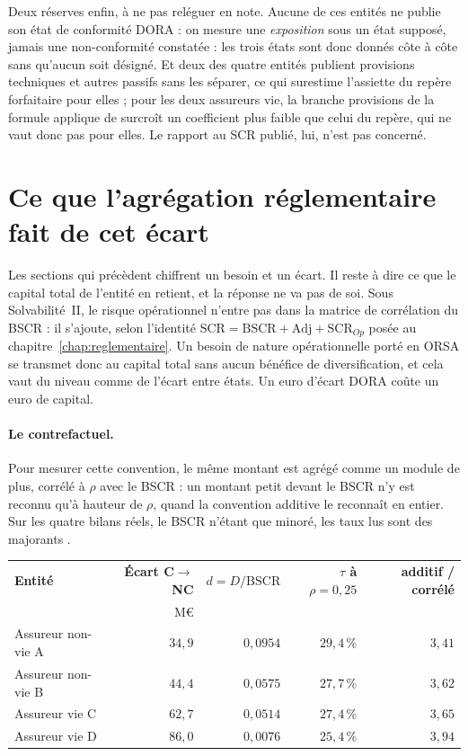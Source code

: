 Deux réserves enfin, à ne pas reléguer en note. Aucune de ces entités ne publie son état de
conformité DORA : on mesure une \emph{exposition} sous un état supposé, jamais une
non-conformité constatée : les trois états sont donc donnés côte à côte sans qu'aucun
soit désigné. Et deux des quatre entités publient \og provisions techniques et autres passifs\fg{}
sans les séparer, ce qui surestime l'assiette du repère forfaitaire pour elles ; pour les deux
assureurs vie, la branche provisions de la formule applique de surcroît un coefficient plus faible
que celui du repère, qui ne vaut donc pas pour elles. Le rapport au SCR publié, lui,
n'est pas concerné.


\section{Ce que l'agrégation réglementaire fait de cet écart}
\label{sec:agregation-scr}

Les sections qui précèdent chiffrent un besoin et un écart. Il reste à dire ce que le capital
total de l'entité en retient, et la réponse ne va pas de soi. Sous Solvabilité~II, le risque
opérationnel n'entre pas dans la matrice de corrélation du BSCR : il s'ajoute,
selon l'identité $\mathrm{SCR} = \mathrm{BSCR} + \mathrm{Adj} + \mathrm{SCR}_{Op}$ posée au
chapitre~\ref{chap:reglementaire}. Un besoin de nature opérationnelle porté en ORSA se
transmet donc au capital total sans aucun bénéfice de diversification, et cela vaut du
niveau comme de l'écart entre états. Un euro d'écart DORA coûte un euro de capital.

\paragraph{Le contrefactuel.} Pour mesurer cette convention, le même montant est agrégé comme un
module de plus, corrélé à $\rho$ avec le BSCR : un montant petit devant le BSCR
n'y est reconnu qu'à hauteur de $\rho$, quand la convention additive le reconnaît en entier. Sur
les quatre bilans réels, le BSCR n'étant que minoré, les taux lus sont des majorants
\matcomp.

\begin{center}\small
\renewcommand{\arraystretch}{1.25}
\begin{tabular}{@{}l r r r r@{}}
\toprule
\textbf{Entité} & \textbf{Écart C$\to$NC} & \textbf{$d = D/\mathrm{BSCR}$} &
\textbf{$\tau$ à $\rho = 0{,}25$} & \textbf{additif / corrélé} \\
 & M\euro & & & \\
\midrule
Assureur non-vie A & $34{,}9$ & $0{,}0954$ & $29{,}4\,\%$ & $3{,}41$ \\
Assureur non-vie B & $44{,}4$ & $0{,}0575$ & $27{,}7\,\%$ & $3{,}62$ \\
Assureur vie C & $62{,}7$ & $0{,}0514$ & $27{,}4\,\%$ & $3{,}65$ \\
Assureur vie D & $86{,}0$ & $0{,}0076$ & $25{,}4\,\%$ & $3{,}94$ \\
\bottomrule
\end{tabular}
\end{center}

